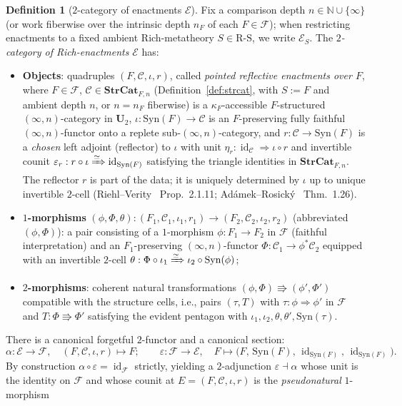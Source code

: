 \documentclass[11pt]{article}
\theoremstyle{plain}
\theoremstyle{definition}
\newtheorem{definition}[theorem]{Definition}
\newcommand{\RS}{\mathrm{R\text{-}S}}
\newcommand{\cF}{\mathcal{F}}
\newcommand{\cC}{\mathcal{C}}
\newcommand{\Syn}{\mathrm{Syn}}
\newcommand{\cE}{\mathcal{E}}
\DeclareMathOperator{\id}{id}
\begin{document}
\begin{definition}[$2$-category of enactments $\cE$]\label{def:enactments}
Fix a comparison depth $n \in \mathbb{N} \cup \{\infty\}$ (or work fiberwise over the intrinsic depth $n_F$ of each $F \in \cF$); when restricting enactments to a fixed ambient Rich-metatheory $S \in \RS$, we write $\cE_S$. The \emph{$2$-category of Rich-enactments} $\cE$ has:
\begin{itemize}
\item \textbf{Objects}: quadruples $(F, \cC, \iota, r)$, called \emph{pointed reflective enactments over $F$}, where $F \in \cF$, $\cC \in \mathbf{StrCat}_{F, n}$ (Definition~\ref{def:strcat}, with $S := F$ and ambient depth $n$, or $n = n_F$ fiberwise) is a $\kappa_F$-accessible $F$-structured $(\infty, n)$-category in $\mathbf{U}_2$, $\iota : \Syn(F) \to \cC$ is an $F$-preserving fully faithful $(\infty, n)$-functor onto a replete sub-$(\infty, n)$-category, and $r : \cC \to \Syn(F)$ is a \emph{chosen} left adjoint (reflector) to $\iota$ with unit $\eta_r : \id_\cC \Rightarrow \iota \circ r$ and invertible counit $\varepsilon_r : r \circ \iota \xRightarrow{\simeq} \id_{\Syn(F)}$ satisfying the triangle identities in $\mathbf{StrCat}_{F, n}$. The reflector $r$ is part of the data; it is uniquely determined by $\iota$ up to unique invertible $2$-cell (Riehl--Verity~\cite{RiehlVerity2022} Prop.~2.1.11; Ad\'amek--Rosick\'y~\cite{AdamekRosicky1994} Thm.~1.26).
\item \textbf{$1$-morphisms} $(\phi, \Phi, \theta) : (F_1, \cC_1, \iota_1, r_1) \to (F_2, \cC_2, \iota_2, r_2)$ (abbreviated $(\phi, \Phi)$): a pair consisting of a $1$-morphism $\phi : F_1 \to F_2$ in $\cF$ (faithful interpretation) and an $F_1$-preserving $(\infty, n)$-functor $\Phi : \cC_1 \to \phi^*\cC_2$ equipped with an invertible $2$-cell $\theta : \Phi \circ \iota_1 \xRightarrow{\simeq} \iota_2 \circ \Syn(\phi)$;
\item \textbf{$2$-morphisms}: coherent natural transformations $(\phi, \Phi) \Rrightarrow (\phi', \Phi')$ compatible with the structure cells, i.e., pairs $(\tau, T)$ with $\tau : \phi \Rightarrow \phi'$ in $\cF$ and $T : \Phi \Rrightarrow \Phi'$ satisfying the evident pentagon with $\iota_1, \iota_2, \theta, \theta', \Syn(\tau)$.
\end{itemize}
There is a canonical forgetful $2$-functor and a canonical section:
\[
  \alpha : \cE \to \cF, \quad (F, \cC, \iota, r) \mapsto F; \qquad
  \varepsilon : \cF \to \cE, \quad F \mapsto \bigl(F,\, \Syn(F),\, \id_{\Syn(F)},\, \id_{\Syn(F)}\bigr).
\]
By construction $\alpha \circ \varepsilon = \id_\cF$ strictly, yielding a $2$-adjunction $\varepsilon \dashv \alpha$ whose unit is the identity on $\cF$ and whose counit at $E = (F, \cC, \iota, r)$ is the \emph{pseudonatural} $1$-morphism

\end{definition}
\end{document}
